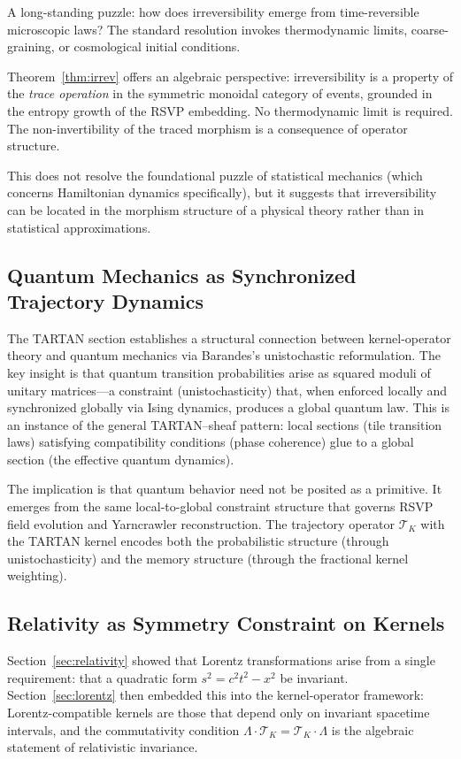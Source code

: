 \documentclass[12pt]{article}
\newcommand{\TK}{\mathcal{T}_K}
\begin{document}
A long-standing puzzle: how does irreversibility emerge from time-reversible
microscopic laws? The standard resolution invokes thermodynamic limits,
coarse-graining, or cosmological initial conditions.

Theorem~\ref{thm:irrev} offers an algebraic perspective: irreversibility
is a property of the \emph{trace operation} in the symmetric monoidal
category of events, grounded in the entropy growth of the RSVP embedding.
No thermodynamic limit is required. The non-invertibility of the traced
morphism is a consequence of operator structure.

This does not resolve the foundational puzzle of statistical mechanics
(which concerns Hamiltonian dynamics specifically), but it suggests
that irreversibility can be located in the morphism structure of a physical
theory rather than in statistical approximations.

\subsection{Quantum Mechanics as Synchronized Trajectory Dynamics}

The TARTAN section establishes a structural connection between kernel-operator
theory and quantum mechanics via Barandes's unistochastic reformulation. The
key insight is that quantum transition probabilities arise as squared moduli
of unitary matrices---a constraint (unistochasticity) that, when enforced
locally and synchronized globally via Ising dynamics, produces a global quantum
law. This is an instance of the general TARTAN--sheaf pattern: local sections
(tile transition laws) satisfying compatibility conditions (phase coherence)
glue to a global section (the effective quantum dynamics).

The implication is that quantum behavior need not be posited as a primitive.
It emerges from the same local-to-global constraint structure that governs
RSVP field evolution and Yarncrawler reconstruction. The trajectory operator
$\TK$ with the TARTAN kernel encodes both the probabilistic structure (through
unistochasticity) and the memory structure (through the fractional kernel
weighting).

\subsection{Relativity as Symmetry Constraint on Kernels}

Section~\ref{sec:relativity} showed that Lorentz transformations arise from
a single requirement: that a quadratic form $s^2 = c^2t^2 - x^2$ be invariant.
Section~\ref{sec:lorentz} then embedded this into the kernel-operator framework:
Lorentz-compatible kernels are those that depend only on invariant spacetime
intervals, and the commutativity condition $\Lambda\cdot\TK = \TK\cdot\Lambda$
is the algebraic statement of relativistic invariance.
\end{document}
